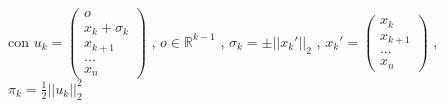 \documentclass[openany]{book}
\begin{document}
\\

con \quad $u_k=\left( \begin{array}{c} o \\ x_k + \sigma_k \\ x_{k+1} \\ ... \\ x_n \end{array} \right)$ \quad , \quad 
 $o\in \mathbb{R}^{k-1}$ \quad , \quad
$\sigma_k = \pm ||x_k'||_2$ \quad , \quad 
$x_k'= \left( \begin{array}{c} x_k \\ x_{k+1} \\ ... \\ x_n \end{array} \right)$ \quad , \quad 
$\pi_k=\frac{1}{2}||u_k||_2^2$ 
\end{document}
